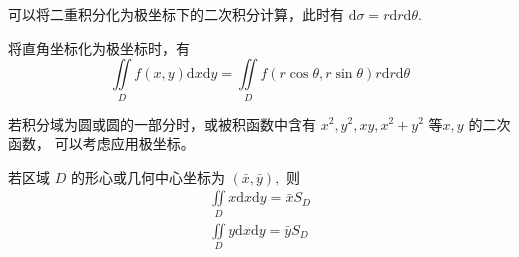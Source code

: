 可以将二重积分化为极坐标下的二次积分计算，此时有 $ \mathrm{d}\sigma = r\mathrm{d}r\mathrm{d}\theta $.

将直角坐标化为极坐标时，有$$
    \iint\limits_{D}f(x,y)\mathrm{d}x\mathrm{d}y = 
    \iint\limits_{D}f(r\cos\theta,r\sin\theta)r\mathrm{d}r\mathrm{d}\theta
$$ 

若积分域为圆或圆的一部分时，或被积函数中含有 $ x^2,y^2,xy,x^2+y^2 $ 等$ x,y $ 的二次函数，
可以考虑应用极坐标。

\begin{Theo}[形心公式]

    若区域 $ D $ 的形心或几何中心坐标为 $ (\bar x,\bar y), $ 则
    \begin{equation*}
        \begin{aligned}
            \iint\limits_{D}x\mathrm{d}x\mathrm{d}y = \bar xS_D\\ 
            \iint\limits_{D}y\mathrm{d}x\mathrm{d}y = \bar yS_D
        \end{aligned}
    \end{equation*}
\end{Theo}